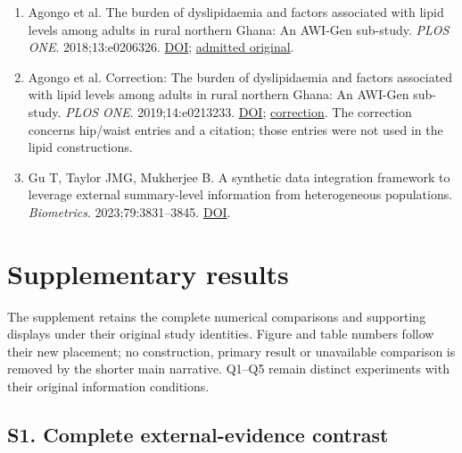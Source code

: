 \documentclass[sigconf,anonymous,review]{acmart}
\begin{document}
\begin{enumerate}
\item Agongo et al. The burden of dyslipidaemia and factors associated with lipid levels among adults in rural northern Ghana: An AWI-Gen sub-study. \emph{PLOS ONE}. 2018;13:e0206326. \href{https://doi.org/10.1371/journal.pone.0206326}{DOI}; \href{https://journals.plos.org/plosone/article?id=10.1371/journal.pone.0206326}{admitted original}.

\item Agongo et al. Correction: The burden of dyslipidaemia and factors associated with lipid levels among adults in rural northern Ghana: An AWI-Gen sub-study. \emph{PLOS ONE}. 2019;14:e0213233. \href{https://doi.org/10.1371/journal.pone.0213233}{DOI}; \href{https://pmc.ncbi.nlm.nih.gov/articles/PMC6392312/}{correction}. The correction concerns hip/\allowbreak{}waist entries and a citation; those entries were not used in the lipid constructions.

\item Gu T, Taylor JMG, Mukherjee B. A synthetic data integration framework to leverage external summary-level information from heterogeneous populations. \emph{Biometrics}. 2023;79:3831–\allowbreak{}3845. \href{https://doi.org/10.1111/biom.13852}{DOI}.

\end{enumerate}

\endgroup

\clearpage

\appendix

\section*{Supplementary results}

\setcounter{figure}{0}

\renewcommand{\thefigure}{S\arabic{figure}}

\setcounter{table}{0}

\renewcommand{\thetable}{S\arabic{table}}

The supplement retains the complete numerical comparisons and supporting displays under their original study identities. Figure and table numbers follow their new placement; no construction, primary result or unavailable comparison is removed by the shorter main narrative. Q1–\allowbreak{}Q5 remain distinct experiments with their original information conditions.


\subsection*{S1. Complete external-evidence contrast}
\end{document}
